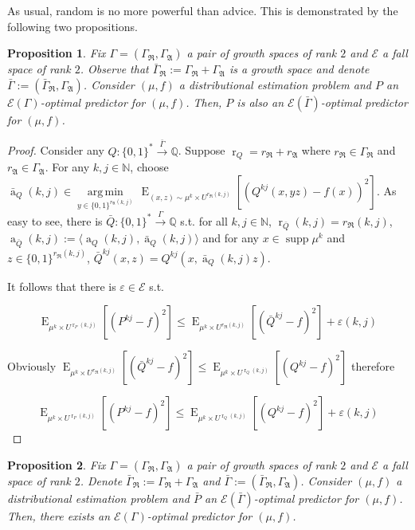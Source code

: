 \documentclass{article}
\numberwithin{equation}{section}
\theoremstyle{definition}
\theoremstyle{plain}
\newtheorem{proposition}{Proposition}[section]
\newcommand{\Words}{{\{ 0, 1 \}^*}}
\newcommand{\WordsLen}[1]{{\{ 0, 1 \}^{#1}}}
\DeclareMathOperator{\Supp}{supp}
\DeclareMathOperator{\E}{E}
\DeclareMathOperator{\R}{r}
\DeclareMathOperator{\A}{a}
\newcommand{\Argmin}[1]{\underset{#1}{\operatorname{arg\,min}}\,}
\newcommand{\Nats}{\mathbb{N}}
\newcommand{\Rats}{\mathbb{Q}}
\newcommand{\Chev}[1]{\langle #1 \rangle}
\newcommand{\GrowR}{\Gamma_{\mathfrak{R}}}
\newcommand{\GrowA}{\Gamma_{\mathfrak{A}}}
\newcommand{\Fall}{\mathcal{E}}
\newcommand{\Scheme}{\xrightarrow{\Gamma}}
\begin{document}
As usual, random is no more powerful than advice. This is demonstrated by the following two propositions.

\begin{proposition}

Fix $\Gamma=(\GrowR,\GrowA)$ a pair of growth spaces of rank $2$ and $\Fall$ a fall space of rank $2$. Observe that $\bar{\Gamma}_{\mathfrak{R}}:=\GrowR+\GrowA$ is a growth space and denote $\bar{\Gamma}:=(\bar{\Gamma}_{\mathfrak{R}},\GrowA)$. Consider $(\mu,f)$ a distributional estimation problem and $P$ an $\Fall(\Gamma)$-optimal predictor for $(\mu,f)$. Then, $P$ is also an $\Fall(\bar{\Gamma})$-optimal predictor for $(\mu,f)$.

\end{proposition}

\begin{proof}

Consider any $Q: \Words \xrightarrow{\bar{\Gamma}} \Rats$. Suppose $\R_Q=r_{\mathfrak{R}}+r_{\mathfrak{A}}$ where $r_{\mathfrak{R}} \in \GrowR$ and $r_{\mathfrak{A}} \in \GrowA$. For any $k,j \in \Nats$, choose ${\bar{\A}_Q(k,j) \in \Argmin{y \in \WordsLen{r_{\mathfrak{A}}(k,j)}} \E_{(x,z) \sim \mu^k \times U^{r_{\mathfrak{R}}(k,j)}}[(Q^{kj}(x,yz) - f(x))^2]}$. As easy to see, there is $\bar{Q}: \Words \Scheme \Rats$ s.t. for all $k,j \in \Nats$, $\R_{\bar{Q}}(k,j) = r_{\mathfrak{R}}(k,j)$, $\A_{\bar{Q}}(k,j):=\Chev{\A_Q(k,j),\bar{\A}_Q(k,j)}$ and for any $x \in \Supp \mu^k$ and $z \in \WordsLen{r_{\mathfrak{R}}(k,j)}$, ${\bar{Q}^{kj}(x,z)=Q^{kj}(x,\bar{\A}_Q(k,j)z)}$.

It follows that there is $\varepsilon \in \Fall$ s.t.

$$\E_{\mu^k \times U^{\R_P(k,j)}}[(P^{kj} - f)^2] \leq \E_{\mu^k \times U^{r_{\mathfrak{R}}(k,j)}}[(\bar{Q}^{kj} - f)^2] + \varepsilon(k,j)$$

Obviously $\E_{\mu^k \times U^{r_{\mathfrak{R}}(k,j)}}[(\bar{Q}^{kj} - f)^2] \leq \E_{\mu^k \times U^{\R_Q(k,j)}}[(Q^{kj} - f)^2]$ therefore

$$\E_{\mu^k \times U^{\R_P(k,j)}}[(P^{kj} - f)^2] \leq \E_{\mu^k \times U^{\R_Q(k,j)}}[(Q^{kj} - f)^2] + \varepsilon(k,j)$$

\end{proof}

\begin{proposition}

Fix $\Gamma=(\GrowR,\GrowA)$ a pair of growth spaces of rank $2$ and $\Fall$ a fall space of rank $2$. Denote $\bar{\Gamma}_{\mathfrak{R}}:=\GrowR+\GrowA$ and $\bar{\Gamma}:=(\bar{\Gamma}_{\mathfrak{R}},\GrowA)$. Consider $(\mu,f)$ a distributional estimation problem and $\bar{P}$ an $\Fall(\bar{\Gamma})$-optimal predictor for $(\mu,f)$. Then, there exists an $\Fall(\Gamma)$-optimal predictor for $(\mu,f)$.

\end{proposition}
\end{document}
